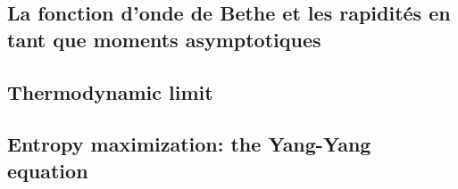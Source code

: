 \subsection{La fonction d'onde de Bethe et les rapidités en tant que moments asymptotiques}


\subsection{Thermodynamic limit}


\subsection{Entropy maximization: the Yang-Yang equation}


